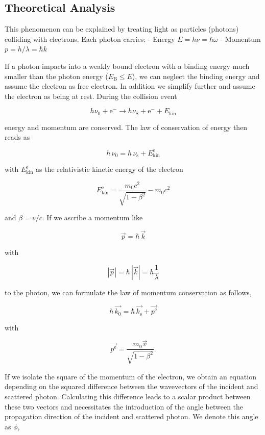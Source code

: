 \documentclass[
  a4paper,
]{book}
\begin{document}
\subsection{Theoretical Analysis}\label{theoretical-analysis}

This phenomenon can be explained by treating light as particles
(photons) colliding with electrons. Each photon carries: - Energy
\(E = h\nu = \hbar\omega\) - Momentum \(p = h/\lambda = \hbar k\)

If a photon impacts into a weakly bound electron with a binding energy
much smaller than the photon energy (\(E_\mathrm{B} \le E\)), we can
neglect the binding energy and assume the electron as free electron. In
addition we simplify further and assume the electron as being at rest.
During the collision event

\[
h \nu_0 + \mathrm{e}^{-} \longrightarrow h \nu_{\mathrm{S}} + \mathrm{e}^{-} + E_{\mathrm{kin}}
\]

energy and momentum are conserved. The law of conservation of energy
then reads as

\[
h \, \nu_0 = h \, \nu_\mathrm{s} + E_{\mathrm{kin}}^{\mathrm{e}}
\]

with \(E_{\mathrm{kin}}^{\mathrm{e}}\) as the relativistic kinetic
energy of the electron

\[
E_{\mathrm{kin}}^{\mathrm{e}} = \frac{m_0 c^2}{\sqrt{1-\beta^2}} - m_0 c^2
\]

and \(\beta = v/c\). If we ascribe a momentum like

\[
\vec{p} = \hbar \, \vec{k}
\]

with

\[
\left| \vec{p} \right| = \hbar \, \left| \vec{k} \right| = h \frac{1}{\lambda}
\]

to the photon, we can formulate the law of momentum conservation as
follows,

\[
\hbar \, \vec{k_0} = \hbar \, \vec{k_{\mathrm{s}}} + \vec{p^{\mathrm{e}}}
\]

with

\[
\vec{p^{\mathrm{e}}} = \frac{m_0 \vec{v}}{\sqrt{1-\beta^2}} \mathrm{.}
\]

If we isolate the square of the momentum of the electron, we obtain an
equation depending on the squared difference between the wavevectors of
the incident and scattered photon. Calculating this difference leads to
a scalar product between these two vectors and necessitates the
introduction of the angle between the propagation direction of the
incident and scattered photon. We denote this angle as \(\phi\),
\end{document}
